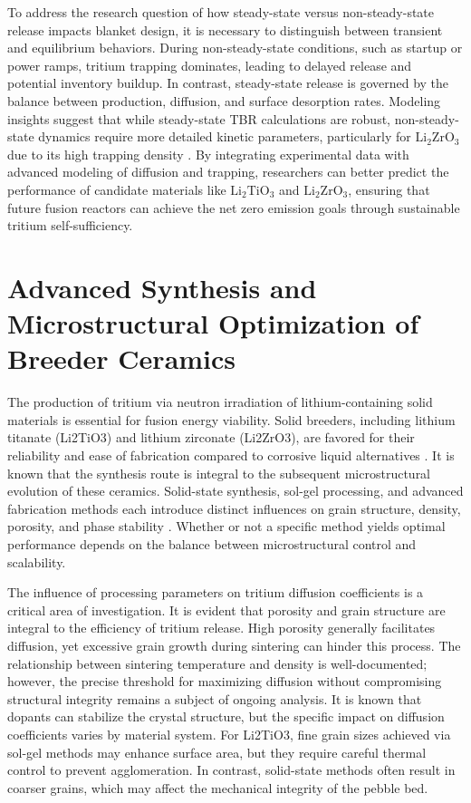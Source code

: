 \documentclass[review,12pt,a4paper]{elsarticle}
\begin{document}
\textcolor{highconf}{To address the research question of how steady-state versus non-steady-state release impacts blanket design, it is necessary to distinguish between transient and equilibrium behaviors. During non-steady-state conditions, such as startup or power ramps, tritium trapping dominates, leading to delayed release and potential inventory buildup. In contrast, steady-state release is governed by the balance between production, diffusion, and surface desorption rates. Modeling insights suggest that while steady-state TBR calculations are robust, non-steady-state dynamics require more detailed kinetic parameters, particularly for $\mathrm{Li_2ZrO_3}$ due to its high trapping density \citep{nishikawa_release_2004}. By integrating experimental data with advanced modeling of diffusion and trapping, researchers can better predict the performance of candidate materials like $\mathrm{Li_2TiO_3}$ and $\mathrm{Li_2ZrO_3}$, ensuring that future fusion reactors can achieve the net zero emission goals through sustainable tritium self-sufficiency.}

\section*{Advanced Synthesis and Microstructural Optimization of Breeder Ceramics}


\textcolor{highconf}{The production of tritium via neutron irradiation of lithium-containing solid materials is essential for fusion energy viability. Solid breeders, including lithium titanate (Li2TiO3) and lithium zirconate (Li2ZrO3), are favored for their reliability and ease of fabrication compared to corrosive liquid alternatives \citep{wu_experiment_2024}. It is known that the synthesis route is integral to the subsequent microstructural evolution of these ceramics. Solid-state synthesis, sol-gel processing, and advanced fabrication methods each introduce distinct influences on grain structure, density, porosity, and phase stability \citep{wu_experiment_2024}. Whether or not a specific method yields optimal performance depends on the balance between microstructural control and scalability.}

\textcolor{highconf}{The influence of processing parameters on tritium diffusion coefficients is a critical area of investigation. It is evident that porosity and grain structure are integral to the efficiency of tritium release. High porosity generally facilitates diffusion, yet excessive grain growth during sintering can hinder this process. The relationship between sintering temperature and density is well-documented; however, the precise threshold for maximizing diffusion without compromising structural integrity remains a subject of ongoing analysis. It is known that dopants can stabilize the crystal structure, but the specific impact on diffusion coefficients varies by material system. For Li2TiO3, fine grain sizes achieved via sol-gel methods may enhance surface area, but they require careful thermal control to prevent agglomeration. In contrast, solid-state methods often result in coarser grains, which may affect the mechanical integrity of the pebble bed.}
\end{document}
